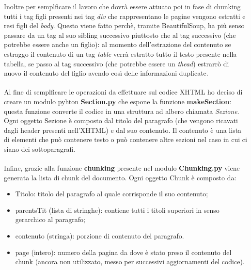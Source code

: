 Inoltre per semplficare il lavoro che dovrà essere attuato poi in fase di chunking tutti i tag figli presenti nei tag \emph{div} che rappresentano le pagine vengono estratti e resi figli del \emph{body}.
Questo viene fatto perchè, tramite BeautifulSoup, ha più senso passare da un tag al suo sibling successivo piuttosto che al tag successivo (che potrebbe essere anche un figlio): al momento dell'estrazione del contenuto se estraggo il contenuto di un tag \emph{table} verrà estratto tutto il testo presente nella tabella, se passo al tag successivo (che potrebbe essere un \emph{thead}) estrarrò di nuovo il contenuto del figlio avendo così delle informazioni duplicate.
\\\\Al fine di semplficare le operazioni da effettuare sul codice XHTML ho deciso di creare un modulo pyhton \textbf{Section.py} che espone la funzione \textbf{makeSection}: questa funzione converte il codice in una struttura ad albero chiamata \emph{Sezione}.
Ogni oggetto Sezione è composto dal titolo del paragrafo (che vengono ricavati dagli header presenti nell'XHTML) e dal suo contenuto. Il contenuto è una lista di elementi che può contenere testo o può contenere altre sezioni nel caso in cui ci siano dei sottoparagrafi.
\\\\Infine, grazie alla funzione \textbf{chunking} presente nel modulo \textbf{Chunking.py} viene generata la lista di chunk del documento.
Ogni oggetto Chunk è composto da:
\begin{itemize}
    \item Titolo: titolo del paragrafo al quale corrisponde il suo contenuto;
    \item parentsTit (lista di stringhe): contiene tutti i titoli superiori in senso gerarchico al paragrafo;
    \item contenuto (stringa): porzione di contenuto del paragrafo.
    \item page (intero): numero della pagina da dove è stato preso il contenuto del chunk (ancora non utilizzato, messo per successivi aggiornamenti del codice). 
\end{itemize}

